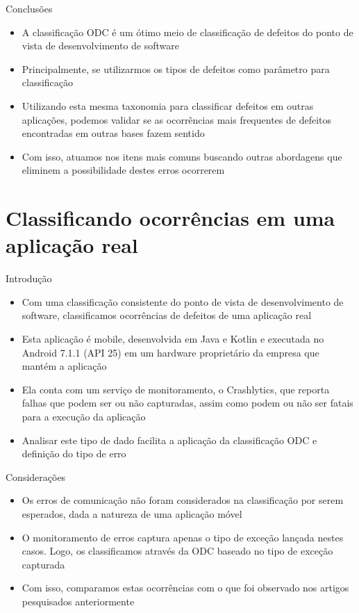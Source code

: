 \documentclass[brazilian]{beamer}
\begin{document}
\begin{frame}{Conclusões}
    \begin{itemize}
        \item A classificação ODC é um ótimo meio de classificação de defeitos do ponto de vista de desenvolvimento de software
        \item Principalmente, se utilizarmos os tipos de defeitos como parâmetro para classificação
        \item Utilizando esta mesma taxonomia para classificar defeitos em outras aplicações, podemos validar se as ocorrências mais frequentes de defeitos encontradas em outras bases fazem sentido
        \item Com isso, atuamos nos itens mais comuns buscando outras abordagens que eliminem a possibilidade destes erros ocorrerem
    \end{itemize}
\end{frame}

\section{Classificando ocorrências em uma aplicação real}

\begin{frame}{Introdução}
    \begin{itemize}
        \item Com uma classificação consistente do ponto de vista de desenvolvimento de software, classificamos ocorrências de defeitos de uma aplicação real
        \item Esta aplicação é mobile, desenvolvida em Java e Kotlin e executada no Android 7.1.1 (API 25) em um hardware proprietário da empresa que mantém a aplicação
        \item Ela conta com um serviço de monitoramento, o Crashlytics, que reporta falhas que podem ser ou não capturadas, assim como podem ou não ser fatais para a execução da aplicação
        \item Analisar este tipo de dado facilita a aplicação da classificação ODC e definição do tipo de erro
    \end{itemize}
\end{frame}

\begin{frame}{Considerações}
    \begin{itemize}
        \item Os erros de comunicação não foram considerados na classificação por serem esperados, dada a natureza de uma aplicação móvel
        \item O monitoramento de erros captura apenas o tipo de exceção lançada nestes casos. Logo, os classificamos através da ODC baseado no tipo de exceção capturada
        \item Com isso, comparamos estas ocorrências com o que foi observado nos artigos pesquisados anteriormente
    \end{itemize}
\end{frame}
\end{document}
